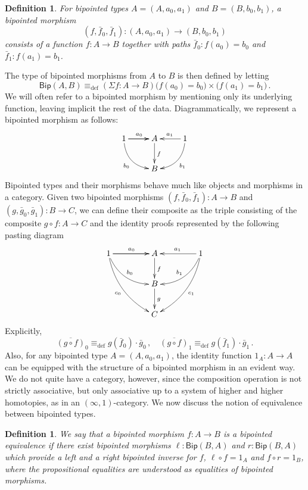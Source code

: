 \documentclass[10pt,a4paper,oneside,reqno]{amsart}
\numberwithin{equation}{section}
\theoremstyle{mythm}
\theoremstyle{mydef}
\newtheorem{definition}[theorem]{Definition}
\theoremstyle{myrmk}
\newcommand{\ie}{\text{i.e.\ }}
\newcommand{\myemph}[1]{\textit{#1}}
\newcommand{\deq}{\equiv}
\newcommand{\defeq}{\deq_{\mathrm{def}}}
\newcommand{\co}{\colon}
\newcommand{\BipHom}{\mathsf{Bip}}
\begin{document}
\begin{definition} For bipointed types $A = (A, a_0, a_1)$ and $B = (B, b_0, b_1)$, a \emph{bipointed morphism} 
\[
(f, \bar{f}_0, \bar{f}_1)  \co (A, a_0, a_1)  \to (B, b_0, b_1)
\] 
consists of a function $f \co A \to B$ together with paths $\bar{f}_0 \co f(a_0) = b_0$ and~$\bar{f}_1 \co f(a_1) = b_1$.  \end{definition}


The type of bipointed morphisms from $A$ to $B$ is then defined by letting
\[
\BipHom(A,B) \defeq (\Sigma f \co A \to B) \big(  f(a_0) =  b_0 \big)  \times \big(  f(a_1) = b_1 \big) \, .
\]
We will often refer to a bipointed morphism by mentioning only its underlying function, leaving implicit
the rest of the data. Diagrammatically, we represent a bipointed morphism as follows:
\[
\xymatrix{
1 \ar[r]   \ar[r]^{a_0} \ar@/_1pc/[dr]_{b_0}  & A  \ar[d]^{f} & 1  \ar[l]_{a_1} \ar@/^1pc/[dl]^{b_1} \\
  & B  &  }
 \]
Bipointed types and their morphisms behave much like objects and morphisms in a category.
Given two bipointed morphisms  $(f, \bar{f}_0, \bar{f}_1) \co A \to B$ and $(g, \bar{g}_0, \bar{g}_1) \co B \to C$, we can define their composite 
 as the triple consisting of the composite $g \circ f \co A \to C$ and the identity proofs represented
by the following pasting diagram
\[
\xymatrix@C=1.5cm{
1 \ar[r]   \ar[r]^{a_0}   \ar@/_1pc/[dr]^{b_0} \ar@/_1pc/[ddr]_{c_0}  & A  \ar[d]^{f} & 1 \ar[l]_{a_1}  \ar@/^1pc/[dl]_{b_1}  \ar@/^1pc/[ddl]^{c_1} \\
  & B \ar[d]^g &   \\
  & C &   }
  \]
Explicitly,
\[
\overline{(g \circ f)}_0 \defeq g(\bar{f}_0) \cdot  \bar{g}_0 \, ,   \quad 
\overline{(g \circ f) }_1 \defeq  g(\bar{f}_1) \cdot   \bar{g}_1 \, .
\]
Also, for any bipointed type $A = (A, a_0, a_1)$, the identity function $1_A \co A \to A$ can be equipped with the structure of a 
bipointed morphism in an evident way. 
We do not quite have a category, however, since the composition operation is not strictly associative, but only associative up to a system of higher and higher 
homotopies, as in an $(\infty,1)$-category.  We now discuss the notion of equivalence between bipointed types.



\begin{definition} We say that a bipointed morphism $f \co A \to B$ is a \myemph{bipointed equivalence}
if there exist bipointed morphisms $\ell \co \BipHom(B,A)$ and $r \co \BipHom(B,A)$ which provide a left and a right bipointed inverse for $f$, \ie  $\ell \circ f = 1_A$ and $f \circ r = 1_B$, 
where the propositional equalities are understood as equalities of bipointed morphisms. 
\end{definition}
\end{document}
